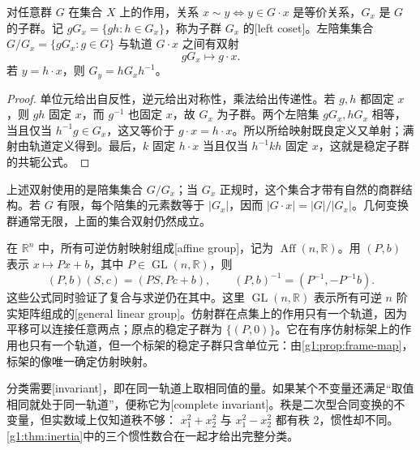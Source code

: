 \begin{proposition}\label{g1:prop:orbit-stabilizer}
	对任意群 \(G\) 在集合 \(X\) 上的作用，关系 \(x\sim y\Longleftrightarrow y\in G\cdot x\) 是等价关系，\(G_x\) 是 \(G\) 的子群。记 \(gG_x=\{gh:h\in G_x\}\)，称为子群 \(G_x\) 的[left coset]。左陪集集合 \(G/G_x=\{gG_x:g\in G\}\) 与轨道 \(G\cdot x\) 之间有双射
	\[
		gG_x\longmapsto g\cdot x.
	\]
	若 \(y=h\cdot x\)，则 \(G_y=hG_xh^{-1}\)。
\end{proposition}
\begin{proof}
	单位元给出自反性，逆元给出对称性，乘法给出传递性。若 \(g,h\) 都固定 \(x\)，则 \(gh\) 固定 \(x\)，而 \(g^{-1}\) 也固定 \(x\)，故 \(G_x\) 为子群。两个左陪集 \(gG_x,hG_x\) 相等，当且仅当 \(h^{-1}g\in G_x\)，这又等价于 \(g\cdot x=h\cdot x\)。所以所给映射既良定义又单射；满射由轨道定义得到。最后，\(k\) 固定 \(h\cdot x\) 当且仅当 \(h^{-1}kh\) 固定 \(x\)，这就是稳定子群的共轭公式。
\end{proof}

上述双射使用的是陪集集合 \(G/G_x\)；当 \(G_x\) 正规时，这个集合才带有自然的商群结构。若 \(G\) 有限，每个陪集的元素数等于 \(|G_x|\)，因而 \(|G\cdot x|=|G|/|G_x|\)。几何变换群通常无限，上面的集合双射仍然成立。

\begin{example}\label{g1:exm:frame-orbits}
	在 \(\mathbb R^n\) 中，所有可逆仿射映射组成[affine group]，记为 \(\operatorname{Aff}(n,\mathbb R)\)。用 \((P,b)\) 表示 \(x\mapsto Px+b\)，其中 \(P\in\operatorname{GL}(n,\mathbb R)\)，则
	\[
		(P,b)(S,c)=(PS,Pc+b),\qquad
		(P,b)^{-1}=(P^{-1},-P^{-1}b).
	\]
	这些公式同时验证了复合与求逆仍在其中。这里 \(\operatorname{GL}(n,\mathbb R)\) 表示所有可逆 \(n\) 阶实矩阵组成的[general linear group]。仿射群在点集上的作用只有一个轨道，因为平移可以连接任意两点；原点的稳定子群为 \(\{(P,0)\}\)。它在有序仿射标架上的作用也只有一个轨道，但一个标架的稳定子群只含单位元：由\cref{g1:prop:frame-map}，标架的像唯一确定仿射映射。
\end{example}

分类需要[invariant]，即在同一轨道上取相同值的量。如果某个不变量还满足“取值相同就处于同一轨道”，便称它为[complete invariant]。秩是二次型合同变换的不变量，但实数域上仅知道秩不够： \(x_1^2+x_2^2\) 与 \(x_1^2-x_2^2\) 都有秩 \(2\)，惯性却不同。\cref{g1:thm:inertia}中的三个惯性数合在一起才给出完整分类。

